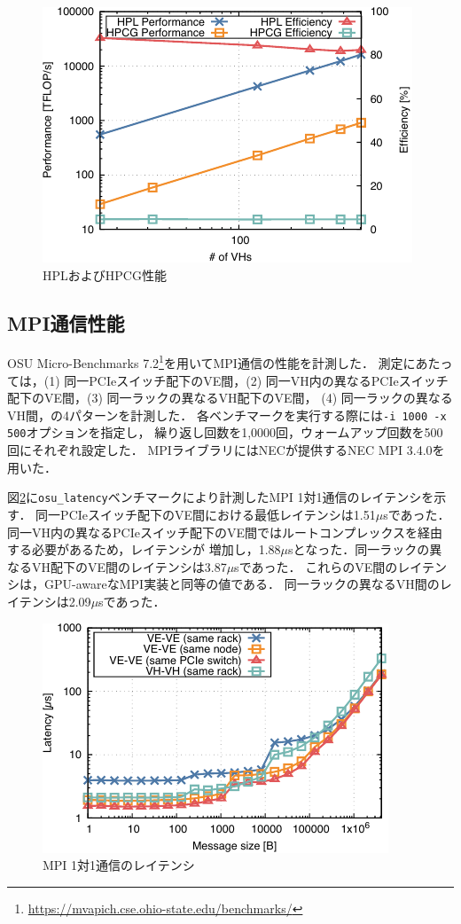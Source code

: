 ﻿\documentclass[submit,techrep,noauthor]{ipsj}
\begin{document}
\begin{figure}[tb]
  \centering
  \includegraphics{figs/hpl_hpcg.pdf}
  \caption{HPLおよびHPCG性能}\label{fig:hpl-hpcg}
\end{figure}

\subsection{MPI通信性能}\label{sec:mpi}

OSU Micro-Benchmarks
7.2\footnote{\url{https://mvapich.cse.ohio-state.edu/benchmarks/}}を用いてMPI通信の性能を計測した．
測定にあたっては，(1) 同一PCIeスイッチ配下のVE間，(2)
同一VH内の異なるPCIeスイッチ配下のVE間，(3) 同一ラックの異なるVH配下のVE間，
(4) 同一ラックの異なるVH間，の4パターンを計測した．
各ベンチマークを実行する際には\verb|-i 1000 -x 500|オプションを指定し，
繰り返し回数を1,0000回，ウォームアップ回数を500回にそれぞれ設定した．
MPIライブラリにはNECが提供するNEC MPI 3.4.0を用いた．

図\ref{fig:mpi-lat}に\verb|osu_latency|ベンチマークにより計測したMPI 1対1通信のレイテンシを示す．
同一PCIeスイッチ配下のVE間における最低レイテンシは1.51$\mu$sであった．
同一VH内の異なるPCIeスイッチ配下のVE間ではルートコンプレックスを経由する必要があるため，レイテンシが
増加し，1.88$\mu$sとなった．同一ラックの異なるVH配下のVE間のレイテンシは3.87$\mu$sであった．
これらのVE間のレイテンシは，GPU-awareなMPI実装\cite{Shafie2022}と同等の値である．
同一ラックの異なるVH間のレイテンシは2.09$\mu$sであった．

\begin{figure}[tb]
  \centering
  \includegraphics{figs/mpi_latency.pdf}
  \caption{MPI 1対1通信のレイテンシ}\label{fig:mpi-lat}
\end{figure}
\end{document}
